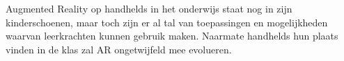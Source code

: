 \documentclass[pdftex,a4paper,12pt,twoside]{report}
\begin{document}
Augmented Reality op handhelds in het onderwijs staat nog in zijn kinderschoenen, maar toch zijn er al tal van toepassingen en mogelijkheden waarvan leerkrachten kunnen gebruik maken. Naarmate handhelds hun plaats vinden in de klas zal AR ongetwijfeld mee evolueren. \\




\clearpage
{}








\clearpage
{}
\listoffigures


\clearpage
{}
\listoftables

\clearpage
{}%
%
%
%
%
%
%
\printnomenclature
\end{document}
